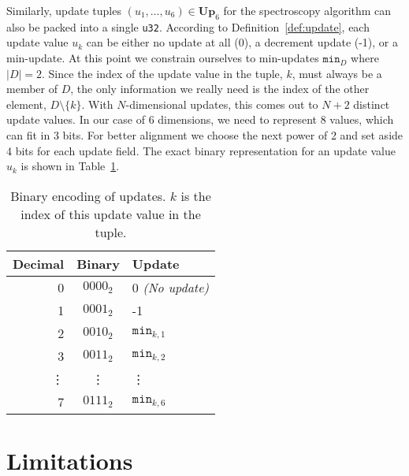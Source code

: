 Similarly, update tuples $(u_1, \ldots, u_6) \in \mathbf{Up}_6$
for the spectroscopy algorithm can also be packed into a single \texttt{u32}.
According to Definition~\ref{def:update}, each update value $u_k$ can be either
no update at all (0),
a decrement update (-1),
or a min-update.
At this point we constrain ourselves to min-updates $\mathtt{min}_D$  %
where $|D| = 2$.
Since the index of the update value in the tuple, $k$, must always be a member of $D$,
the only information we really need is the index of the other element, $D \setminus \{k\}$.
With $N$-dimensional updates, this comes out to $N + 2$ distinct update values.
In our case of 6 dimensions, we need to represent 8 values,
which can fit in 3 bits.
For better alignment we choose the next power
of 2 and set aside 4 bits for each update field.
The exact binary representation for an update value $u_k$ is shown in
Table~\ref{tab:update_encoding}.

\begin{table}[ht]
\centering
\caption{Binary encoding of updates. $k$ is the index of this update value in
the tuple.}\label{tab:update_encoding}
\begin{tabular}{ r c l }
    \toprule
    Decimal & Binary & Update \\
    \midrule
    0 & $0000_2$ & 0 \emph{(No update)} \\
    1 & $0001_2$ & -1 \\
    2 & $0010_2$ & $\mathtt{min}_{k, 1}$ \\ %
    3 & $0011_2$ & $\mathtt{min}_{k, 2}$ \\ %
    \vdots & \vdots & \vdots \\
    7 & $0111_2$ & $\mathtt{min}_{k, 6}$ \\ %
    \bottomrule
\end{tabular}
\end{table}


\section{Limitations}

